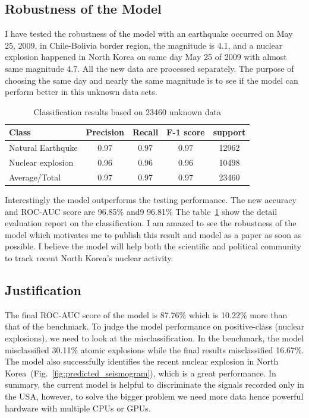 \documentclass[12pt]{article}
\begin{document}
        \subsection{Robustness of the Model}
        I have tested the robustness of the model with an earthquake occurred on May 25, 2009, in Chile-Bolivia border region, the magnitude is 4.1, and a nuclear explosion happened in North Korea on same day May 25 of 2009 with almost same magnitude 4.7. All the new data are processed separately. The purpose of choosing the same day and nearly the same magnitude is to see if the model can perform better in this unknown data sets.
        
                \begin{table}[!htb]
                    \caption{Classification results based on 23460 unknown data} \vspace{0.5em}
                    \label{tab:robust_classification_report}
                    \centering
                    \begin{tabular}{l c c c c}
                        \hline
                        Class & Precision & Recall & F-1 score & support\\
                        \hline
                        Natural Earthquke & 0.97 & 0.97 & 0.97 & 12962 \\
                        Nuclear explosion & 0.96 & 0.96 & 0.96 & 10498\\
                        Average/Total & 0.97 & 0.97 & 0.97 &23460\\[1ex]
                        \hline
                    \end{tabular}
                \end{table}
        
        Interestingly the model outperforms the testing performance. The new accuracy and ROC-AUC score are 96.85$\%$ and9 96.81$\%$ The table~\ref{tab:robust_classification_report} show the detail evaluation report on the classification. I am amazed to see the robustness of the model which motivates me to publish this result and model as a paper as soon as possible. I believe the model will help both the scientific and political community to track recent North Korea's nuclear activity.

        
        \subsection{Justification}
        The final ROC-AUC score of the model is 87.76$\%$ which is 10.22$\%$ more than that of the benchmark. To judge the model performance on positive-class (nuclear explosions), we need to look at the misclassification. In the benchmark, the model misclassified 30.11$\%$ atomic explosions while the final results misclassified 16.67$\%$. The model also successfully identifies the recent nuclear explosion in North Korea~(Fig.~\ref{fig:predicted_seismogram}), which is a great performance. In summary, the current model is helpful to discriminate the signals recorded only in the USA, however, to solve the bigger problem we need more data hence powerful hardware with multiple CPUs or GPUs.
    
\end{document}
